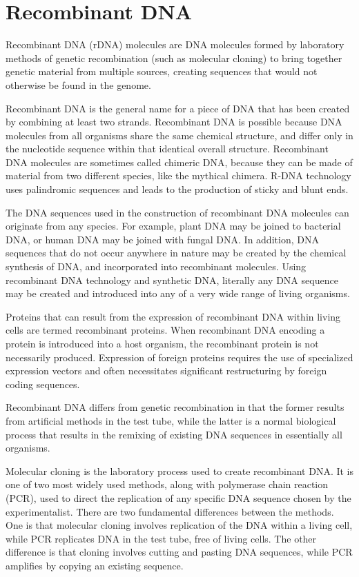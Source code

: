 \hypertarget{recombinant-dna}{%
\section{Recombinant DNA}\label{recombinant-dna}}

Recombinant DNA (rDNA) molecules are DNA molecules formed by laboratory methods of genetic recombination (such as molecular cloning) to bring together genetic material from multiple sources, creating sequences that would not otherwise be found in the genome.

Recombinant DNA is the general name for a piece of DNA that has been created by combining at least two strands. Recombinant DNA is possible because DNA molecules from all organisms share the same chemical structure, and differ only in the nucleotide sequence within that identical overall structure. Recombinant DNA molecules are sometimes called chimeric DNA, because they can be made of material from two different species, like the mythical chimera. R-DNA technology uses palindromic sequences and leads to the production of sticky and blunt ends.

The DNA sequences used in the construction of recombinant DNA molecules can originate from any species. For example, plant DNA may be joined to bacterial DNA, or human DNA may be joined with fungal DNA. In addition, DNA sequences that do not occur anywhere in nature may be created by the chemical synthesis of DNA, and incorporated into recombinant molecules. Using recombinant DNA technology and synthetic DNA, literally any DNA sequence may be created and introduced into any of a very wide range of living organisms.

Proteins that can result from the expression of recombinant DNA within living cells are termed recombinant proteins. When recombinant DNA encoding a protein is introduced into a host organism, the recombinant protein is not necessarily produced. Expression of foreign proteins requires the use of specialized expression vectors and often necessitates significant restructuring by foreign coding sequences.

Recombinant DNA differs from genetic recombination in that the former results from artificial methods in the test tube, while the latter is a normal biological process that results in the remixing of existing DNA sequences in essentially all organisms.

Molecular cloning is the laboratory process used to create recombinant DNA. It is one of two most widely used methods, along with polymerase chain reaction (PCR), used to direct the replication of any specific DNA sequence chosen by the experimentalist. There are two fundamental differences between the methods. One is that molecular cloning involves replication of the DNA within a living cell, while PCR replicates DNA in the test tube, free of living cells. The other difference is that cloning involves cutting and pasting DNA sequences, while PCR amplifies by copying an existing sequence.

